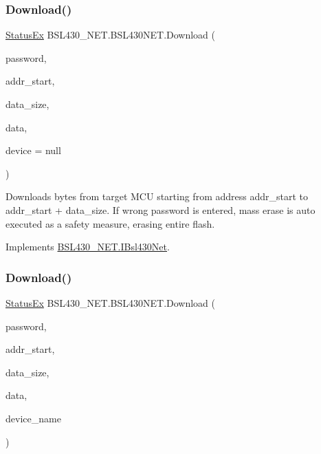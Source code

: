\subsubsection{\texorpdfstring{Download()}{Download()}\hspace{0.1cm}{\footnotesize\ttfamily [1/2]}}
{\footnotesize\ttfamily \mbox{\hyperlink{class_b_s_l430___n_e_t_1_1_status_ex}{Status\+Ex}} B\+S\+L430\+\_\+\+N\+E\+T.\+B\+S\+L430\+N\+E\+T.\+Download (\begin{DoxyParamCaption}\item[{byte \mbox{[}$\,$\mbox{]}}]{password,  }\item[{int}]{addr\+\_\+start,  }\item[{int}]{data\+\_\+size,  }\item[{out List$<$ byte $>$}]{data,  }\item[{\mbox{\hyperlink{class_b_s_l430___n_e_t_1_1_bsl430_net_device}{Bsl430\+Net\+Device}}}]{device = {\ttfamily null} }\end{DoxyParamCaption})}



Downloads bytes from target M\+CU starting from address \textquotesingle{}addr\+\_\+start\textquotesingle{} to \textquotesingle{}addr\+\_\+start\textquotesingle{} + \textquotesingle{}data\+\_\+size\textquotesingle{}. If wrong password is entered, mass erase is auto executed as a safety measure, erasing entire flash. 



Implements \mbox{\hyperlink{interface_b_s_l430___n_e_t_1_1_i_bsl430_net_abd3e49c1f00bfa2f42d58094e2ae3526}{B\+S\+L430\+\_\+\+N\+E\+T.\+I\+Bsl430\+Net}}.

\mbox{\label{class_b_s_l430___n_e_t_1_1_b_s_l430_n_e_t_ad7b703fdca5e09026e64027bf5947848}} 
\subsubsection{\texorpdfstring{Download()}{Download()}\hspace{0.1cm}{\footnotesize\ttfamily [2/2]}}
{\footnotesize\ttfamily \mbox{\hyperlink{class_b_s_l430___n_e_t_1_1_status_ex}{Status\+Ex}} B\+S\+L430\+\_\+\+N\+E\+T.\+B\+S\+L430\+N\+E\+T.\+Download (\begin{DoxyParamCaption}\item[{byte \mbox{[}$\,$\mbox{]}}]{password,  }\item[{int}]{addr\+\_\+start,  }\item[{int}]{data\+\_\+size,  }\item[{out List$<$ byte $>$}]{data,  }\item[{string}]{device\+\_\+name }\end{DoxyParamCaption})}



